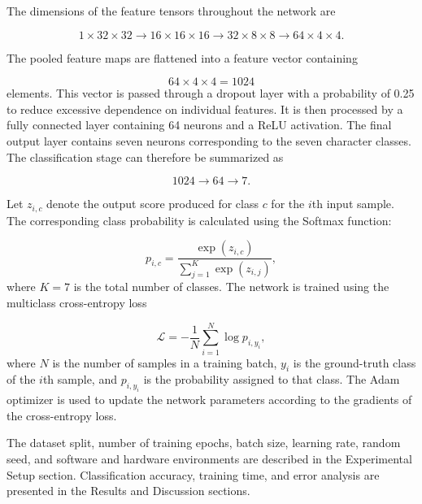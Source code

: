 \documentclass[conference]{IEEEtran}
\begin{document}
The dimensions of the feature tensors throughout the network are

\begin{equation}
1\times32\times32
\rightarrow
16\times16\times16
\rightarrow
32\times8\times8
\rightarrow
64\times4\times4.
\label{eq:cnn_dimensions}
\end{equation}

The pooled feature maps are flattened into a feature vector containing

\begin{equation}
64\times4\times4=1024
\label{eq:flattened_features}
\end{equation}
elements. This vector is passed through a dropout layer with a
probability of 0.25 to reduce excessive dependence on individual
features. It is then processed by a fully connected layer containing
64 neurons and a ReLU activation. The final output layer contains
seven neurons corresponding to the seven character classes. The
classification stage can therefore be summarized as

\begin{equation}
1024\rightarrow64\rightarrow7.
\label{eq:cnn_classifier_dimensions}
\end{equation}

Let $z_{i,c}$ denote the output score produced for class $c$ for the
$i$th input sample. The corresponding class probability is calculated
using the Softmax function:

\begin{equation}
p_{i,c}
=
\frac{\exp(z_{i,c})}
{\displaystyle\sum_{j=1}^{K}\exp(z_{i,j})},
\label{eq:softmax}
\end{equation}
where $K=7$ is the total number of classes. The network is trained using
the multiclass cross-entropy loss

\begin{equation}
\mathcal{L}
=
-\frac{1}{N}
\sum_{i=1}^{N}
\log p_{i,y_i},
\label{eq:cross_entropy}
\end{equation}
where $N$ is the number of samples in a training batch, $y_i$ is the
ground-truth class of the $i$th sample, and $p_{i,y_i}$ is the
probability assigned to that class. The Adam optimizer is used to
update the network parameters according to the gradients of the
cross-entropy loss.

The dataset split, number of training epochs, batch size, learning
rate, random seed, and software and hardware environments are
described in the Experimental Setup section. Classification accuracy,
training time, and error analysis are presented in the Results and
Discussion sections.
\end{document}
